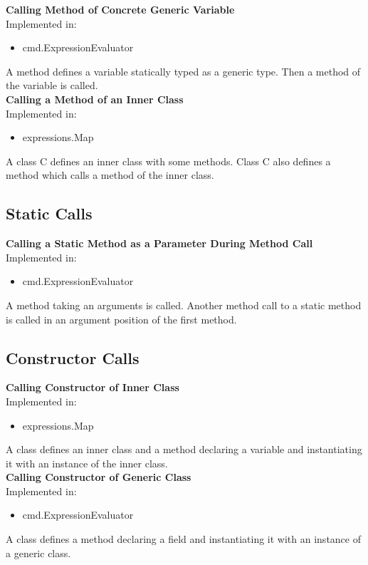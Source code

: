 \documentclass{article}
\begin{document}
\noindent
\textbf{Calling Method of Concrete Generic Variable}\\
Implemented in: 
\begin{itemize}
    \item cmd.ExpressionEvaluator
\end{itemize}
A method defines a variable statically typed as a generic type. Then a method of the variable is called.\\

\noindent
\textbf{Calling a Method of an Inner Class}\\
Implemented in: 
\begin{itemize}
    \item expressions.Map
\end{itemize}
A class C defines an inner class with some methods. Class C also defines a method which calls a method of the inner class.\\

\subsection{Static Calls}

\textbf{Calling a Static Method as a Parameter During Method Call}\\
Implemented in: 
\begin{itemize}
    \item cmd.ExpressionEvaluator
\end{itemize}
A method taking an arguments is called. Another method call to a static method is called in an argument position of the first method.\\

\subsection{Constructor Calls}

\textbf{Calling Constructor of Inner Class}\\
Implemented in: 
\begin{itemize}
    \item expressions.Map
\end{itemize}
A class defines an inner class and a method declaring a variable and instantiating it with an instance of the inner class.\\

\noindent
\textbf{Calling Constructor of Generic Class}\\
Implemented in: 
\begin{itemize}
    \item cmd.ExpressionEvaluator
\end{itemize}
A class defines a method declaring a field and instantiating it with an instance of a generic class.\\
\end{document}
